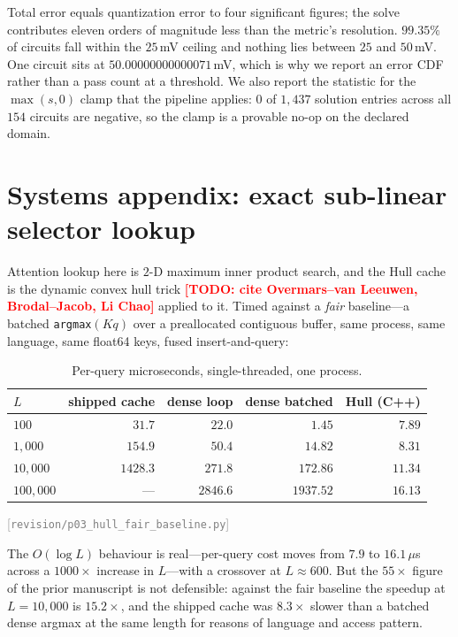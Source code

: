 \documentclass[11pt]{article}
\newcommand{\src}[1]{{\footnotesize\textcolor{gray}{[\texttt{#1}]}}}
\newcommand{\todo}[1]{\textcolor{red}{\textbf{[TODO: #1]}}}
\begin{document}
Total error equals quantization error to four significant figures; the solve
contributes eleven orders of magnitude less than the metric's resolution.
$99.35\%$ of circuits fall within the $25$\,mV ceiling and nothing lies between
$25$ and $50$\,mV. One circuit sits at $50.00000000000071$\,mV, which is why we
report an error CDF rather than a pass count at a threshold. We also report the
statistic for the $\max(s,0)$ clamp that the pipeline applies: $0$ of $1{,}437$
solution entries across all $154$ circuits are negative, so the clamp is a
provable no-op on the declared domain.

\section{Systems appendix: exact sub-linear selector lookup}\label{sec:hull}

Attention lookup here is $2$-D maximum inner product search, and the Hull cache
is the dynamic convex hull trick \todo{cite Overmars--van Leeuwen,
Brodal--Jacob, Li Chao} applied to it. Timed against a \emph{fair} baseline---a
batched \texttt{argmax}$(Kq)$ over a preallocated contiguous buffer, same
process, same language, same float64 keys, fused insert-and-query:

\begin{table}[t]
\centering
\caption{Per-query microseconds, single-threaded, one process.}
\label{tab:hull}
\small
\begin{tabular}{lrrrr}
\toprule
$L$ & shipped cache & dense loop & dense batched & Hull (C++) \\
\midrule
$100$     & $31.7$    & $22.0$   & $\mathbf{1.45}$   & $7.89$ \\
$1{,}000$ & $154.9$   & $50.4$   & $14.82$           & $\mathbf{8.31}$ \\
$10{,}000$& $1428.3$  & $271.8$  & $172.86$          & $\mathbf{11.34}$ \\
$100{,}000$& ---      & $2846.6$ & $1937.52$         & $\mathbf{16.13}$ \\
\bottomrule
\end{tabular}
\src{revision/p03\_hull\_fair\_baseline.py}
\end{table}

The $O(\log L)$ behaviour is real---per-query cost moves from $7.9$ to
$16.1\,\mu$s across a $1000\times$ increase in $L$---with a crossover at
$L \approx 600$. But the $55\times$ figure of the prior manuscript is not
defensible: against the fair baseline the speedup at $L=10{,}000$ is
$15.2\times$, and the shipped cache was $8.3\times$ slower than a batched dense
argmax at the same length for reasons of language and access pattern.
\end{document}
